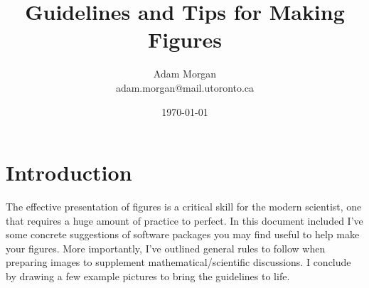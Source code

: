 \documentclass[12pt]{article}
\title{Guidelines and Tips for Making Figures}
\author{Adam Morgan
\\
adam.morgan@mail.utoronto.ca
}
\date{\today}
\begin{document}
\maketitle

\section{Introduction}
\noindent 
The effective presentation of figures is a critical skill for the modern scientist, one that requires a huge amount of practice to perfect. In this document included I've some concrete suggestions of software packages you may find useful to help make your figures. More importantly,  I've outlined general rules to follow when preparing images to supplement mathematical/scientific discussions. I conclude by drawing a few example pictures to bring the guidelines to life. 
\end{document}
